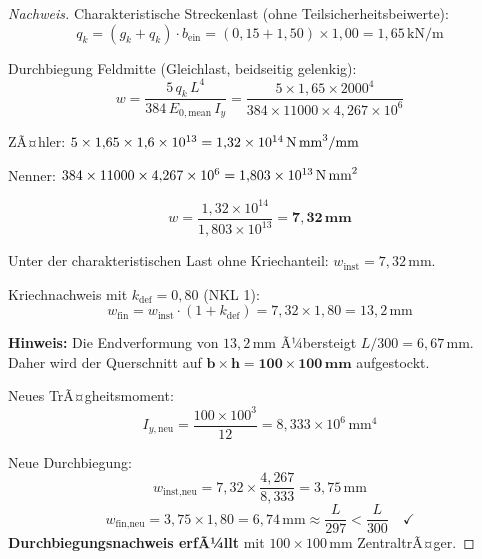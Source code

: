 ﻿\documentclass[12pt,a4paper]{article}
\theoremstyle{definition}
\theoremstyle{plain}
\theoremstyle{remark}
\begin{document}
\begin{proof}[Nachweis]
Charakteristische Streckenlast (ohne Teilsicherheitsbeiwerte):
\begin{equation*}
  q_k = (g_k + q_k) \cdot b_{\text{ein}} = (0{,}15 + 1{,}50) \times 1{,}00
      = 1{,}65\,\text{kN/m}
\end{equation*}

Durchbiegung Feldmitte (Gleichlast, beidseitig gelenkig):
\begin{equation*}
  w = \frac{5\,q_k\,L^4}{384\,E_{0,\text{mean}}\,I_y}
    = \frac{5 \times 1{,}65 \times 2000^4}{384 \times 11000 \times 4{,}267 \times 10^6}
\end{equation*}

ZÃ¤hler: $5 \times 1{,}65 \times 1{,}6 \times 10^{13} = 1{,}32 \times 10^{14}\,\text{N\,mm}^3/\text{mm}$

Nenner: $384 \times 11000 \times 4{,}267 \times 10^6 = 1{,}803 \times 10^{13}\,\text{N\,mm}^2$

\begin{equation*}
  w = \frac{1{,}32 \times 10^{14}}{1{,}803 \times 10^{13}} = \mathbf{7{,}32\,\text{mm}}
\end{equation*}

Unter der charakteristischen Last ohne Kriechanteil:
$w_{\text{inst}} = 7{,}32\,\text{mm}$.

\medskip
Kriechnachweis mit $k_{\text{def}} = 0{,}80$ (NKL 1):
\begin{equation*}
  w_{\text{fin}} = w_{\text{inst}} \cdot (1 + k_{\text{def}})
  = 7{,}32 \times 1{,}80 = 13{,}2\,\text{mm}
\end{equation*}

\medskip
\textbf{Hinweis:} Die Endverformung von $13{,}2\,\text{mm}$ Ã¼bersteigt $L/300 = 6{,}67\,\text{mm}$.
Daher wird der Querschnitt auf $\mathbf{b \times h = 100 \times 100\,\text{mm}}$ aufgestockt.

\medskip
Neues TrÃ¤gheitsmoment:
\begin{equation*}
  I_{y,\text{neu}} = \frac{100 \times 100^3}{12} = 8{,}333 \times 10^6\,\text{mm}^4
\end{equation*}

Neue Durchbiegung:
\begin{equation*}
  w_{\text{inst,neu}} = 7{,}32 \times \frac{4{,}267}{8{,}333} = 3{,}75\,\text{mm}
\end{equation*}
\begin{equation*}
  w_{\text{fin,neu}} = 3{,}75 \times 1{,}80 = 6{,}74\,\text{mm} \approx \frac{L}{297} < \frac{L}{300} \quad \checkmark
\end{equation*}
\textbf{Durchbiegungsnachweis erfÃ¼llt} mit $100 \times 100\,\text{mm}$ ZentraltrÃ¤ger.
\end{proof}
\end{document}
